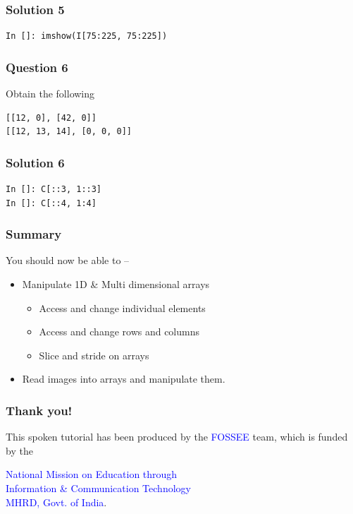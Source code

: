 \documentclass[presentation]{beamer}
\begin{document}
\begin{frame}[fragile]
\frametitle{Solution 5}
\label{sec-13}

\begin{verbatim}
In []: imshow(I[75:225, 75:225])
\end{verbatim}
\end{frame}
\begin{frame}[fragile]
\frametitle{Question 6}
\label{sec-14}

  Obtain the following
\begin{verbatim}
[[12, 0], [42, 0]]
[[12, 13, 14], [0, 0, 0]]
\end{verbatim}
\end{frame}
\begin{frame}[fragile]
\frametitle{Solution 6}
\label{sec-15}

\begin{verbatim}
In []: C[::3, 1::3]
In []: C[::4, 1:4]
\end{verbatim}
\end{frame}
\begin{frame}
\frametitle{Summary}
\label{sec-16}

  You should now be able to --
\begin{itemize}
\item Manipulate 1D \& Multi dimensional arrays

\begin{itemize}
\item Access and change individual elements
\item Access and change rows and columns
\item Slice and stride on arrays
\end{itemize}

\item Read images into arrays and manipulate them.
\end{itemize}
\end{frame}
\begin{frame}
\frametitle{Thank you!}
\label{sec-17}

  \begin{block}{}
  \begin{center}
  This spoken tutorial has been produced by the
  \textcolor{blue}{FOSSEE} team, which is funded by the 
  \end{center}
  \begin{center}
    \textcolor{blue}{National Mission on Education through \\
      Information \& Communication Technology \\ 
      MHRD, Govt. of India}.
  \end{center}  
  \end{block}
\end{frame}
\end{document}
